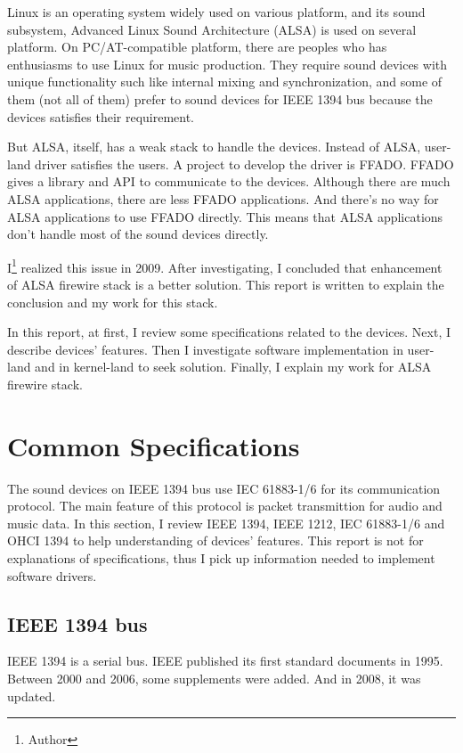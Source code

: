 \documentclass[onecolumn]{article}
\begin{document}
Linux is an operating system widely used on various platform, and its sound subsystem, Advanced Linux Sound Architecture (ALSA) is used on several platform. On PC/AT-compatible platform, there are peoples who has enthusiasms to use Linux for music production. They require sound devices with unique functionality such like internal mixing and synchronization, and some of them (not all of them) prefer to sound devices for IEEE 1394 bus because the devices satisfies their requirement.

But ALSA, itself, has a weak stack to handle the devices. Instead of ALSA, user-land driver satisfies the users. A project to develop the driver is FFADO. FFADO gives a library and API to communicate to the devices. Although there are much ALSA applications, there are less FFADO applications. And there's no way for ALSA applications to use FFADO directly. This means that ALSA applications don't handle most of the sound devices directly.

I\footnote{Author} realized this issue in 2009. After investigating, I concluded that enhancement of ALSA firewire stack is a better solution. This report is written to explain the conclusion and my work for this stack.

In this report, at first, I review some specifications related to the devices. Next, I describe devices' features. Then I investigate software implementation in user-land and in kernel-land to seek solution. Finally, I explain my work for ALSA firewire stack.


\section{Common Specifications}

The sound devices on IEEE 1394 bus use IEC 61883-1/6 for its communication protocol. The main feature of this protocol is packet transmittion for audio and music data. In this section, I review IEEE 1394, IEEE 1212, IEC 61883-1/6 and OHCI 1394 to help understanding of devices' features. This report is not for explanations of specifications, thus I pick up information needed to implement software drivers.

\subsection{IEEE 1394 bus}

IEEE 1394 is a serial bus. IEEE published its first standard documents in 1995\cite{ieee1394-1}. Between 2000 and 2006, some supplements were added\cite{ieee1394-1-a, ieee1394-1-b, ieee1394-1-c}. And in 2008, it was updated\cite{ieee1394-2}.
\end{document}
